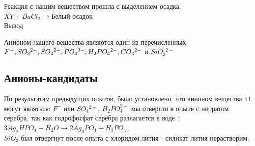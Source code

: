 \documentclass[a4paper,14pt,titlepage,twoside]{article}
\begin{document}
            Реакция с нашим веществом прошла с выделением осадка.
            $XY + BaCl_2 \to \mbox{Белый осадок}$\\

            Вывод 

            Анионом нашего вещества являются один из перечисленных 
            $F^-, SO_3{}^{2-}, SO_4{}^{2-}, \newline PO_4{}^{3-}, H_2PO_4{}^{2-}, CO_3{}^{2-}$ и 
            $SiO_3{}^{2-}$

        \subsection{Анионы-кандидаты}
            По результатам предыдущих опытов, было установлено, что анионом вещества 
            $11$ могут являться: $F^-$ или $ SO_4{}^{2-}$. $H_2PO_4^{3-}$ мы отвергли в опыте с
            нитратом серебра, так как гидрофосфат серебра разлагается в воде : \\

            $3Ag_2HPO_4 + H_2O \to 2Ag_3PO_4 + H_3PO_4$.\\

            $SiO_3$ был отвергнут после опыта с хлоридом лития - силикат лития нерастворим.
        
\end{document}
